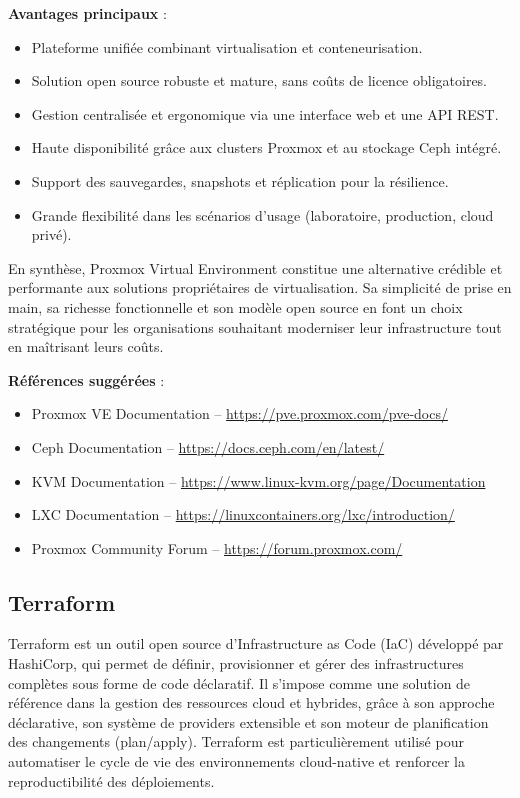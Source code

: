 \textbf{Avantages principaux} :
\begin{itemize}
	\item Plateforme unifiée combinant virtualisation et conteneurisation.
	\item Solution open source robuste et mature, sans coûts de licence obligatoires.
	\item Gestion centralisée et ergonomique via une interface web et une API REST.
	\item Haute disponibilité grâce aux clusters Proxmox et au stockage Ceph intégré.
	\item Support des sauvegardes, snapshots et réplication pour la résilience.
	\item Grande flexibilité dans les scénarios d’usage (laboratoire, production, cloud privé).
\end{itemize}

En synthèse, Proxmox Virtual Environment constitue une alternative crédible et performante aux solutions propriétaires de virtualisation. Sa simplicité de prise en main, sa richesse fonctionnelle et son modèle open source en font un choix stratégique pour les organisations souhaitant moderniser leur infrastructure tout en maîtrisant leurs coûts.

\textbf{Références suggérées} :
\begin{itemize}
	\item Proxmox VE Documentation – \url{https://pve.proxmox.com/pve-docs/}
	\item Ceph Documentation – \url{https://docs.ceph.com/en/latest/}
	\item KVM Documentation – \url{https://www.linux-kvm.org/page/Documentation}
	\item LXC Documentation – \url{https://linuxcontainers.org/lxc/introduction/}
	\item Proxmox Community Forum – \url{https://forum.proxmox.com/}
\end{itemize}

\subsection{Terraform}

Terraform est un outil open source d’Infrastructure as Code (IaC) développé par HashiCorp, qui permet de définir, provisionner et gérer des infrastructures complètes sous forme de code déclaratif. Il s’impose comme une solution de référence dans la gestion des ressources cloud et hybrides, grâce à son approche déclarative, son système de providers extensible et son moteur de planification des changements (plan/apply). Terraform est particulièrement utilisé pour automatiser le cycle de vie des environnements cloud-native et renforcer la reproductibilité des déploiements.

